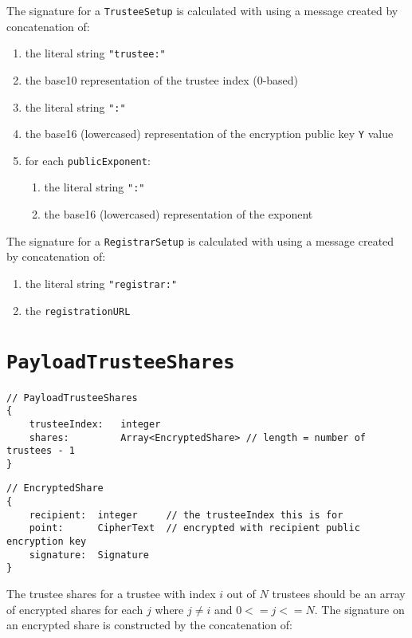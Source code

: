 The signature for a \texttt{TrusteeSetup} is calculated with using a message created by concatenation of:
\begin{enumerate}
    \item the literal string \lstinline[style=ES6]{"trustee:"}
    \item the base10 representation of the trustee index (0-based)
    \item the literal string \lstinline[style=ES6]{":"}
    \item the base16 (lowercased) representation of the encryption public key \texttt{Y} value
    \item for each \texttt{publicExponent}:
          \begin{enumerate}
              \item the literal string \lstinline[style=ES6]{":"}
              \item the base16 (lowercased) representation of the exponent
          \end{enumerate}
\end{enumerate}

The signature for a \texttt{RegistrarSetup} is calculated with using a message created by concatenation of:

\begin{enumerate}
    \item the literal string \lstinline[style=ES6]{"registrar:"}
    \item the \texttt{registrationURL}
\end{enumerate}


\section*{\texttt{PayloadTrusteeShares}}
\label{dt:payload:shares}
\begin{lstlisting}[style=ES6]
// PayloadTrusteeShares
{
    trusteeIndex:   integer
    shares:         Array<EncryptedShare> // length = number of trustees - 1
}
\end{lstlisting}
\vspace*{-0.95em}
\label{dt:encshare}
\begin{lstlisting}[style=ES6, firstnumber=last]
// EncryptedShare
{
    recipient:  integer     // the trusteeIndex this is for
    point:      CipherText  // encrypted with recipient public encryption key
    signature:  Signature
}
\end{lstlisting}

The trustee shares for a trustee with index $i$ out of $N$ trustees should be an array of encrypted shares for each $j$ where $j \neq i$ and $0 <= j <= N$. The signature on an encrypted share is constructed by the concatenation of:

